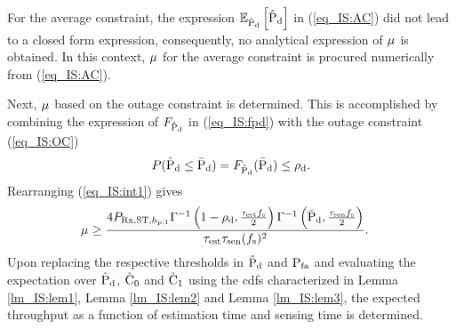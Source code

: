 {\begin{IEEEproof}[Solution]
For the average constraint, the expression ${\mathbb E}_{\hat{\text{P}}_{\text{d}}}\left[ \hat{\text{P}}_{\text{d}} \right]$ in (\ref{eq_IS:AC}) did not lead to a closed form expression, consequently, no analytical expression of $\mu^{\text{}}$ is obtained. In this context, $\mu^{\text{}}$ for the average constraint is procured numerically from (\ref{eq_IS:AC}). 

Next, $\mu^{\text{}}$ based on the outage constraint is determined. This is accomplished by combining the expression of $F_{\hat{\text{P}}_{\text{d}}}$ in (\ref{eq_IS:fpd}) with the outage constraint (\ref{eq_IS:OC}) 
\begin{align}
P(\hat{\text{P}}_{\text{d}} \le \bar{\text{P}}_{\text{d}}) = F_{\hat{\text{P}}_{\text{d}}}(\bar{\text{P}}_{\text{d}}) \le \rho_{\text{d}}. 
\label{eq_IS:int1}
\end{align}
Rearranging (\ref{eq_IS:int1}) gives
\begin{align}
\mu^{\text{}} &\ge \frac{4 P_{\text{Rx,ST,$h_{\text{p,1}}$}} \Gamma^{-1} \left(1 - \rho_{\text{d}}, \frac{\tau_{\text{est}} f_{\text{s}}}{2}\right) \Gamma^{-1} \left(\bar{\text{P}}_{\text{d}}, \frac{\tau_{\text{sen}} f_{\text{s}}}{2}\right)}{ \tau_{\text{est}} \tau_{\text{sen}} (f_{\text{s}})^2  }. 
\label{eq_IS:throc}
\end{align}
 Upon replacing the respective thresholds in $\hat{\text{P}}_{\text{d}}$ and $\text{P}_{\text{fa}}$ and evaluating the expectation over $\hat{\text{P}}_{\text{d}}$, $\hat{\text{C}}_{\text{0}}$ and $\hat{\text{C}}_{\text{1}}$ using the cdfs characterized in Lemma \ref{lm_IS:lem1}, Lemma \ref{lm_IS:lem2} and Lemma \ref{lm_IS:lem3}, the expected throughput as a function of estimation time and sensing time is determined. 
\end{IEEEproof}
}
